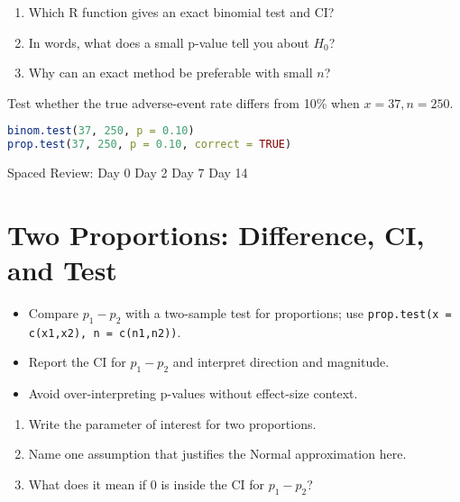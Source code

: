\documentclass[11pt,a4paper]{article}
\def\textbf#1{#1}%
\newcommand{\reviewticks}{
  \vspace{0.4em}
  \noindent\scriptsize\textbf{Spaced Review:}
  \fbox{\phantom{D0}} Day 0\quad
  \fbox{\phantom{D2}} Day 2\quad
  \fbox{\phantom{D7}} Day 7\quad
  \fbox{\phantom{D14}} Day 14
}
\begin{document}
\begin{recallbox}
\begin{enumerate}
  \item Which R function gives an exact binomial test and CI?
  \item In words, what does a small p-value tell you about \(H_0\)?
  \item Why can an exact method be preferable with small \(n\)?
\end{enumerate}
\end{recallbox}

\begin{practicebox}
Test whether the true adverse-event rate differs from 10\% when \(x=37, n=250\).
\end{practicebox}

\begin{rbox}
\begin{lstlisting}[language=R]
binom.test(37, 250, p = 0.10)
prop.test(37, 250, p = 0.10, correct = TRUE)
\end{lstlisting}
\end{rbox}

\reviewticks

\section{Two Proportions: Difference, CI, and Test}

\begin{corebox}
\begin{itemize}
  \item Compare \(p_1 - p_2\) with a two-sample test for proportions; use \texttt{prop.test(x = c(x1,x2), n = c(n1,n2))}.
  \item Report the CI for \(p_1 - p_2\) and interpret direction and magnitude.
  \item Avoid over-interpreting p-values without effect-size context.
\end{itemize}
\end{corebox}

\begin{recallbox}
\begin{enumerate}
  \item Write the parameter of interest for two proportions.
  \item Name one assumption that justifies the Normal approximation here.
  \item What does it mean if 0 is inside the CI for \(p_1 - p_2\)?
\end{enumerate}
\end{recallbox}
\end{document}
